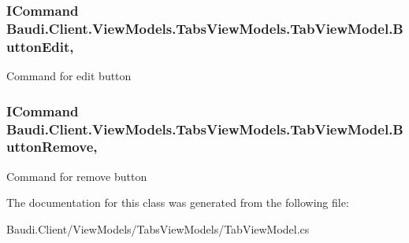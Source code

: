\subsubsection[{Button\+Edit}]{\setlength{\rightskip}{0pt plus 5cm}I\+Command Baudi.\+Client.\+View\+Models.\+Tabs\+View\+Models.\+Tab\+View\+Model.\+Button\+Edit\hspace{0.3cm}{\ttfamily [get]}, {\ttfamily [set]}}\label{class_baudi_1_1_client_1_1_view_models_1_1_tabs_view_models_1_1_tab_view_model_aafe406c7e143b73a88e6b1de174a470c}


Command for edit button 

\hypertarget{class_baudi_1_1_client_1_1_view_models_1_1_tabs_view_models_1_1_tab_view_model_a895b8e41b63892f512ed2d1846b0be0b}{}
\subsubsection[{Button\+Remove}]{\setlength{\rightskip}{0pt plus 5cm}I\+Command Baudi.\+Client.\+View\+Models.\+Tabs\+View\+Models.\+Tab\+View\+Model.\+Button\+Remove\hspace{0.3cm}{\ttfamily [get]}, {\ttfamily [set]}}\label{class_baudi_1_1_client_1_1_view_models_1_1_tabs_view_models_1_1_tab_view_model_a895b8e41b63892f512ed2d1846b0be0b}


Command for remove button 



The documentation for this class was generated from the following file\+:\begin{DoxyCompactItemize}
\item 
Baudi.\+Client/\+View\+Models/\+Tabs\+View\+Models/Tab\+View\+Model.\+cs\end{DoxyCompactItemize}

